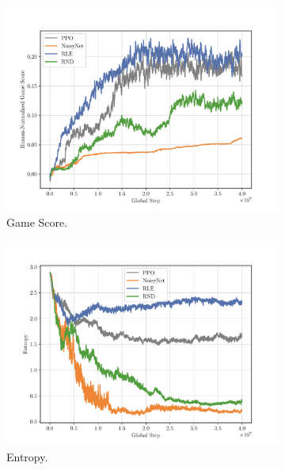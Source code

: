 \begin{figure}[h!]
  \centering
  \begin{subfigure}[b]{0.45\textwidth}
    \centering
    \includegraphics[width=\textwidth]{figures/plot_Alien_Score.pdf}
    \caption{Game Score.}
    \label{fig:alien-score}
  \end{subfigure}
  \hfill
  \begin{subfigure}[b]{0.45\textwidth}
    \centering
    \includegraphics[width=\textwidth]{figures/plot_Alien_Entropy.pdf}
    \caption{Entropy.}
    \label{fig:alien-entropy}
  \end{subfigure}
  \begin{subfigure}[b]{0.45\textwidth}
    \centering

\end{subfigure}
\end{figure}
